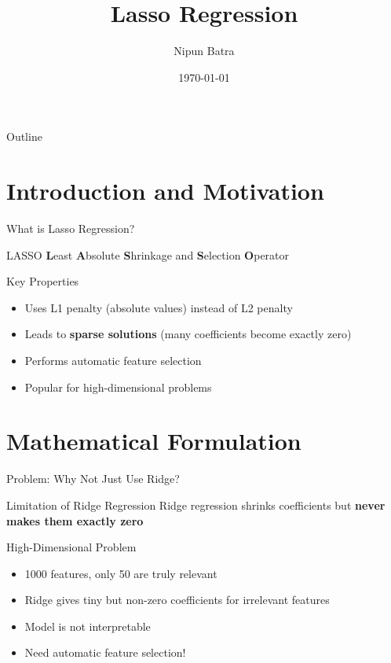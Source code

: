 \documentclass{beamer}
\title{Lasso Regression}
\date{\today}
\author{Nipun Batra}
\institute{IIT Gandhinagar}
\begin{document}
  \maketitle
  
\begin{frame}{Outline}
\tableofcontents
\end{frame}

\section{Introduction and Motivation}

\begin{frame}{What is Lasso Regression?}
\begin{definitionbox}{LASSO}
\textbf{L}east \textbf{A}bsolute \textbf{S}hrinkage and \textbf{S}election \textbf{O}perator
\end{definitionbox}
\pause

\begin{keypointsbox}{Key Properties}
\begin{itemize}
\item Uses L1 penalty (absolute values) instead of L2 penalty
\item Leads to \textbf{sparse solutions} (many coefficients become exactly zero)
\item Performs automatic feature selection
\item Popular for high-dimensional problems
\end{itemize}
\end{keypointsbox}
\end{frame}

\section{Mathematical Formulation}

\begin{frame}{Problem: Why Not Just Use Ridge?}
\begin{alertbox}{Limitation of Ridge Regression}
Ridge regression shrinks coefficients but \textbf{never makes them exactly zero}
\end{alertbox}
\pause

\begin{examplebox}{High-Dimensional Problem}
\begin{itemize}
\item 1000 features, only 50 are truly relevant
\item Ridge gives tiny but non-zero coefficients for irrelevant features
\item Model is not interpretable
\item Need automatic feature selection!
\end{itemize}
\end{examplebox}
\end{frame}
\end{document}
